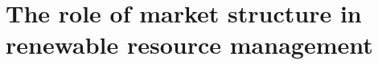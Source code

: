 \documentclass[a4paper, twoside, 11pt]{report}
\begin{document}
	\part{The role of market structure in renewable resource management}	
	\renewcommand{\thesection}{\arabic{section}}
	\renewcommand{\thesubsection}{\arabic{subsection}}
	\renewcommand{\thefigure}{4.\arabic{figure}}
	\renewcommand{\thetable}{4.\arabic{table}}
	
	\clearpage
	\begin{appendices}
	\setcounter{figure}{0}	
	\setcounter{equation}{0}
	\renewcommand{\thesection}{\Alph{section}}
	\renewcommand{\thefigure}{4.\Alph{figure}}
	\renewcommand{\thetable}{4. \Alph{table}}
	\renewcommand{\thesubsection}{\Alph{subsection}}
	
	\clearpage
	\end{appendices}	
    	
    	
	 
    \cleardoublepage
    
    \clearpage
    
    
\end{document}
